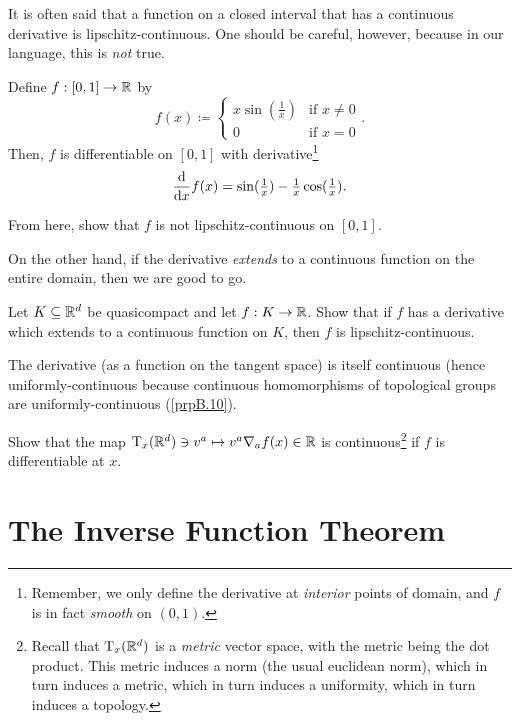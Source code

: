It is often said that a function on a closed interval that has a continuous derivative is lipschitz-continuous.  One should be careful, however, because in our language, this is \emph{not} true.
\begin{exm}
Define $f:[0,1]\rightarrow \R$ by
\begin{equation}
f(x)\coloneqq \begin{cases}x\sin (\tfrac{1}{x}) & \text{if }x\neq 0 \\ 0 & \text{if }x=0\end{cases}.
\end{equation}
Then, $f$ is differentiable on $[0,1]$ with derivative\footnote{Remember, we only define the derivative at \emph{interior} points of domain, and $f$ is in fact \emph{smooth} on $(0,1)$.}
\begin{equation}
\frac{\dif}{\dif x}f(x)=\sin (\tfrac{1}{x})-\tfrac{1}{x}\cos (\tfrac{1}{x}).
\end{equation}
\begin{exr}
From here, show that $f$ is not lipschitz-continuous on $[0,1]$.
\end{exr}
\end{exm}
On the other hand, if the derivative \emph{extends} to a continuous function on the entire domain, then we are good to go.
\begin{exr}
Let $K\subseteq \R ^d$ be quasicompact and let $f:K\rightarrow \R$.  Show that if $f$ has a derivative which extends to a continuous function on $K$, then $f$ is lipschitz-continuous.
\end{exr}

The derivative (as a function on the tangent space) is itself continuous (hence uniformly-continuous because continuous homomorphisms of topological groups are uniformly-continuous (\cref{prpB.10}).
\begin{exr}
Show that the map $\tangent{\R ^d}{x}\ni v^a\mapsto v^a\nabla _af(x)\in \R$ is continuous\footnote{Recall that $\tangent{\R ^d}{x}$ is a \emph{metric} vector space, with the metric being the dot product.  This metric induces a norm (the usual euclidean norm), which in turn induces a metric, which in turn induces a uniformity, which in turn induces a topology.} if $f$ is differentiable at $x$.
\end{exr}

\section{The Inverse Function Theorem}

